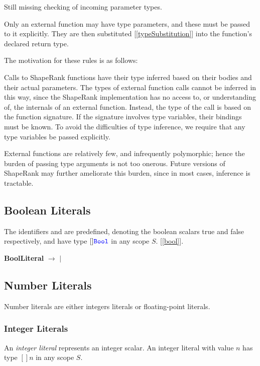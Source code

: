 \documentclass{article}
\begin{document}
{\em 

Still missing checking of incoming parameter types.

Only an external function may have type parameters, and these must be passed to it explicitly. They are then substituted [\ref{typeSubstitution}] into the function's declared return type.

The motivation for these rules is as follows:

Calls to ShapeRank functions have their type inferred based on their bodies and their actual parameters. The types of external function calls  cannot be inferred in this way,
since the ShapeRank implementation has no access to, or understanding of, the internals of an external function. Instead, the type of the call is based on the function signature. 
If the signature involves type variables, their bindings must be known.  To avoid the difficulties of type inference, we require that any type variables be passed explicitly.

External functions are relatively few, and infrequently polymorphic; hence the burden of passing type arguments is not too onerous. Future versions of ShapeRank may 
further ameliorate this burden, since  in most cases, inference is tractable.
}


\subsection{Boolean Literals}
\label{booleanLiterals}

The identifiers \TRUE{} and \FALSE{} are predefined,  denoting the boolean scalars true and false respectively, and have type $[]\texttt{\color{blue} Bool}{}$ in any scope $S$. [\ref{bool}].

{\bf BoolLiteral} $\rightarrow$ \TRUE{} $|$ \FALSE{}

\subsection{Number Literals}
\label{numberLiterals}

Number literals are either integers literals or floating-point literals.

\NumberLiteral{}

\subsubsection{Integer Literals}
\label{integerLiterals}

An {\em integer literal} represents an integer scalar.  An integer literal with value $n$ has type $[]n{}$ in any scope $S$.
\end{document}
